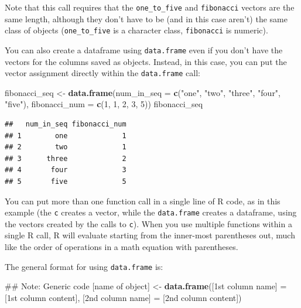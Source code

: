 \documentclass[]{book}
\makeatletter
\newenvironment{Shaded}{\begin{snugshade}}{\end{snugshade}}
\newcommand{\KeywordTok}[1]{\textcolor[rgb]{0.13,0.29,0.53}{\textbf{#1}}}
\newcommand{\DataTypeTok}[1]{\textcolor[rgb]{0.13,0.29,0.53}{#1}}
\newcommand{\DecValTok}[1]{\textcolor[rgb]{0.00,0.00,0.81}{#1}}
\newcommand{\StringTok}[1]{\textcolor[rgb]{0.31,0.60,0.02}{#1}}
\newcommand{\NormalTok}[1]{#1}
\newenvironment{kframe}{%
\medskip{}
\setlength{\fboxsep}{.8em}
 \def\at@end@of@kframe{}%
 \ifinner\ifhmode%
  \def\at@end@of@kframe{\end{minipage}}%
  \begin{minipage}{\columnwidth}%
 \fi\fi%
 \def\FrameCommand##1{\hskip\@totalleftmargin \hskip-\fboxsep
 \colorbox{shadecolor}{##1}\hskip-\fboxsep
     \hskip-\linewidth \hskip-\@totalleftmargin \hskip\columnwidth}%
 \MakeFramed {\advance\hsize-\width
   \@totalleftmargin\z@ \linewidth\hsize
   \@setminipage}}%
 {\par\unskip\endMakeFramed%
 \at@end@of@kframe}
\renewenvironment{Shaded}{\begin{kframe}}{\end{kframe}}
\newenvironment{rmdblock}[1]
  {
  \begin{itemize}
  \renewcommand{\labelitemi}{
    \raisebox{-.7\height}[0pt][0pt]{
      {\setkeys{Gin}{width=3em,keepaspectratio}\texttt{[image: images/\#1]}}
    }
  }
  \setlength{\fboxsep}{1em}
  \begin{kframe}
  \item
  }
  {
  \end{kframe}
  \end{itemize}
  }
\newenvironment{rmdnote}
  {\begin{rmdblock}{note}}
  {\end{rmdblock}}
\theoremstyle{definition}
\theoremstyle{definition}
\theoremstyle{definition}
\theoremstyle{remark}
\makeatother
\begin{document}
Note that this call requires that the \texttt{one\_to\_five} and
\texttt{fibonacci} vectors are the same length, although they don't have
to be (and in this case aren't) the same class of objects
(\texttt{one\_to\_five} is a character class, \texttt{fibonacci} is
numeric).

You can also create a dataframe using \texttt{data.frame} even if you
don't have the vectors for the columns saved as objects. Instead, in
this case, you can put the vector assignment directly within the
\texttt{data.frame} call:

\begin{Shaded}
\begin{Highlighting}[]
\NormalTok{fibonacci_seq <-}\StringTok{ }\KeywordTok{data.frame}\NormalTok{(}\DataTypeTok{num_in_seq =} \KeywordTok{c}\NormalTok{(}\StringTok{"one"}\NormalTok{, }\StringTok{"two"}\NormalTok{, }\StringTok{"three"}\NormalTok{,}
                                           \StringTok{"four"}\NormalTok{, }\StringTok{"five"}\NormalTok{),}
                            \DataTypeTok{fibonacci_num =} \KeywordTok{c}\NormalTok{(}\DecValTok{1}\NormalTok{, }\DecValTok{1}\NormalTok{, }\DecValTok{2}\NormalTok{, }\DecValTok{3}\NormalTok{, }\DecValTok{5}\NormalTok{))}
\NormalTok{fibonacci_seq}
\end{Highlighting}
\end{Shaded}

\begin{verbatim}
##   num_in_seq fibonacci_num
## 1        one             1
## 2        two             1
## 3      three             2
## 4       four             3
## 5       five             5
\end{verbatim}

\begin{rmdnote}
You can put more than one function call in a single line of R code, as
in this example (the \texttt{c} creates a vector, while the
\texttt{data.frame} creates a dataframe, using the vectors created by
the calls to \texttt{c}). When you use multiple functions within a
single R call, R will evaluate starting from the inner-most parentheses
out, much like the order of operations in a math equation with
parentheses.
\end{rmdnote}

The general format for using \texttt{data.frame} is:

\begin{Shaded}
\begin{Highlighting}[]
\NormalTok{## Note: Generic code}
\NormalTok{[name of object] <-}\StringTok{ }\KeywordTok{data.frame}\NormalTok{([1st column name] =}\StringTok{ }\NormalTok{[1st column content],}
\NormalTok{                               [2nd column name] =}\StringTok{ }\NormalTok{[2nd column content])}
\end{Highlighting}
\end{Shaded}
\end{document}
